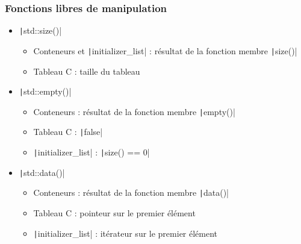 \documentclass[C++.tex]{subfiles}
\begin{document}
\begin{frame}[fragile]
	\frametitle{Fonctions libres de manipulation}
	\begin{itemize}
		\item \texttt|std::size()|
		\begin{itemize}
			\item Conteneurs et \texttt|initializer_list| : résultat de la fonction membre \texttt|size()|
			\item Tableau C : taille du tableau
		\end{itemize}

		\item \texttt|std::empty()|
		\begin{itemize}
			\item Conteneurs : résultat de la fonction membre \texttt|empty()|
			\item Tableau C : \texttt|false|
			\item \texttt|initializer_list| : \texttt|size() == 0|
		\end{itemize}

		\item \texttt|std::data()|
		\begin{itemize}
			\item Conteneurs : résultat de la fonction membre \texttt|data()|
			\item Tableau C : pointeur sur le premier élément
			\item \texttt|initializer_list| : itérateur sur le premier élément
		\end{itemize}
	\end{itemize}

\end{frame}
\end{document}
